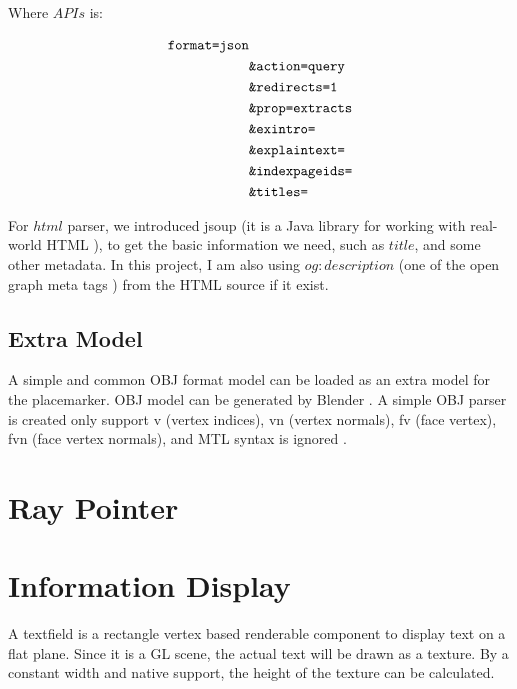 Where $APIs$ is:

\[
\begin{array}{lr}
\begin{aligned}
\texttt{format=json}&\\
&\texttt{\&action=query}\\
&\texttt{\&redirects=1}\\
&\texttt{\&prop=extracts}\\
&\texttt{\&exintro=}\\
&\texttt{\&explaintext=}\\
&\texttt{\&indexpageids=}\\
&\texttt{\&titles=}\\
\end{aligned}
\end{array}
\]

For $html$ parser, we introduced jsoup (it is a Java library for working with real-world HTML \cite{joup.2016}), to get the basic information we need, such as $title$, and some other metadata. In this project, I am also using $og:description$ (one of the open graph meta tags \cite{ogp.2014}) from the HTML source if it exist.

\subsection{Extra Model}
\label{section:obj-model}

A simple and common OBJ format model can be loaded as an extra model for the placemarker. OBJ model can be generated by Blender \cite{blender.2016}. A simple OBJ parser is created only support v (vertex indices), vn (vertex normals), fv (face vertex), fvn (face vertex normals), and MTL syntax is ignored \cite{shen.obj-parser.2011}.

\section{Ray Pointer}
\label{section:ray-pointer}

\section{Information Display}

A textfield is a rectangle vertex based renderable component to display text on a flat plane. Since it is a GL scene, the actual text will be drawn as a texture. By a constant width and native  support, the height of the texture can be calculated. 


